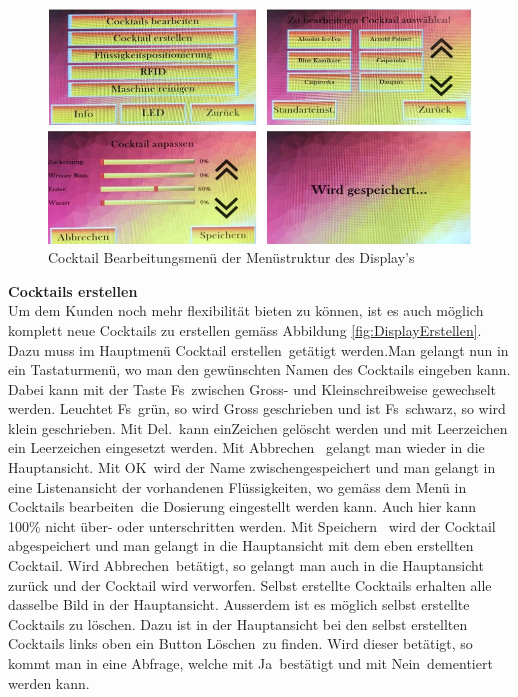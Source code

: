\begin{figure}[H]
	\centering
	\includegraphics[width=\textwidth]{graphics/DisplayBearbeiten}
	\caption{Cocktail Bearbeitungsmenü der Menüstruktur des Display's}
	\label{fig:DisplayBearbeiten}
\end{figure}

\textbf{Cocktails erstellen}\\
Um dem Kunden noch mehr flexibilität bieten zu können, ist es auch möglich komplett neue Cocktails zu erstellen gemäss Abbildung \ref{fig:DisplayErstellen}. Dazu muss im Hauptmenü \flqq Cocktail erstellen\frqq~getätigt werden.Man gelangt nun in ein Tastaturmenü, wo man den gewünschten Namen des Cocktails eingeben kann. Dabei kann mit der Taste \flqq Fs\frqq~zwischen Gross- und Kleinschreibweise gewechselt werden. Leuchtet \flqq Fs\frqq~grün, so wird Gross geschrieben und ist \flqq Fs\frqq~schwarz, so wird klein geschrieben. Mit \flqq Del.\frqq~kann einZeichen gelöscht werden und mit Leerzeichen ein Leerzeichen eingesetzt werden. Mit \flqq Abbrechen\frqq~ gelangt man wieder in die Hauptansicht. Mit \flqq OK\frqq~wird der Name zwischengespeichert und man gelangt in eine Listenansicht der vorhandenen Flüssigkeiten, wo gemäss dem Menü in \flqq Cocktails bearbeiten\frqq~die Dosierung eingestellt werden kann.  Auch hier kann 100\% nicht über- oder unterschritten werden. Mit \flqq Speichern\frqq~ wird der Cocktail abgespeichert und man gelangt in die Hauptansicht mit dem eben erstellten Cocktail. Wird \flqq Abbrechen\frqq~betätigt, so gelangt man auch in die Hauptansicht zurück und der Cocktail wird verworfen. Selbst erstellte Cocktails erhalten alle dasselbe Bild in der Hauptansicht. Ausserdem ist es möglich selbst erstellte Cocktails zu löschen. Dazu ist in der Hauptansicht bei den selbst erstellten Cocktails links oben ein Button \flqq Löschen\frqq~zu finden. Wird dieser betätigt, so kommt man in eine Abfrage, welche mit \flqq Ja\frqq~bestätigt und mit \flqq Nein\frqq~dementiert werden kann. 

